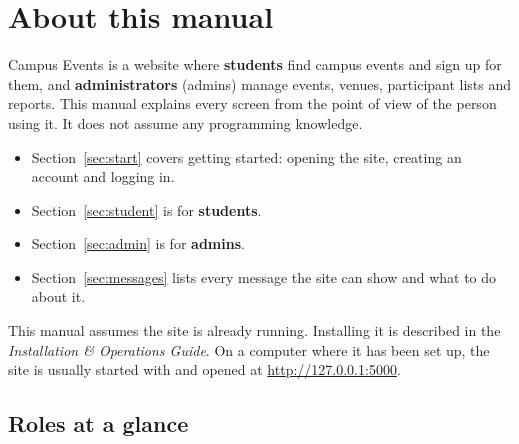 \documentclass[11pt,a4paper]{article}
\begin{document}

\tableofcontents
\newpage

\section{About this manual}

Campus Events is a website where \textbf{students} find campus events and sign up for them, and
\textbf{administrators} (admins) manage events, venues, participant lists and reports. This manual
explains every screen from the point of view of the person using it. It does not assume any
programming knowledge.

\begin{itemize}
  \item Section~\ref{sec:start} covers getting started: opening the site, creating an account and logging in.
  \item Section~\ref{sec:student} is for \textbf{students}.
  \item Section~\ref{sec:admin} is for \textbf{admins}.
  \item Section~\ref{sec:messages} lists every message the site can show and what to do about it.
\end{itemize}

\begin{note}
This manual assumes the site is already running. Installing it is described in the
\emph{Installation \& Operations Guide}. On a computer where it has been set up, the site is
usually started with  and opened at \url{http://127.0.0.1:5000}.
\end{note}

\subsection{Roles at a glance}
\end{document}

